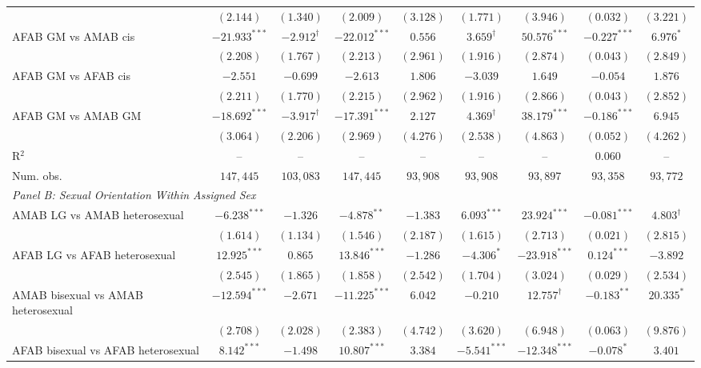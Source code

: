 \begin{table}[htpb!]
{\begin{tabular}{l c c c c c c c c}
 & $(2.144)$ & $(1.340)$ & $(2.009)$ & $(3.128)$ & $(1.771)$ & $(3.946)$ & $(0.032)$ & $(3.221)$ \\
AFAB GM vs AMAB cis & $-21.933^{***}$ & $-2.912^{\dagger}$ & $-22.012^{***}$ & $0.556$ & $3.659^{\dagger}$ & $50.576^{***}$ & $-0.227^{***}$ & $6.976^{*}$ \\
 & $(2.208)$ & $(1.767)$ & $(2.213)$ & $(2.961)$ & $(1.916)$ & $(2.874)$ & $(0.043)$ & $(2.849)$ \\
AFAB GM vs AFAB cis & $-2.551$ & $-0.699$ & $-2.613$ & $1.806$ & $-3.039$ & $1.649$ & $-0.054$ & $1.876$ \\
 & $(2.211)$ & $(1.770)$ & $(2.215)$ & $(2.962)$ & $(1.916)$ & $(2.866)$ & $(0.043)$ & $(2.852)$ \\
AFAB GM vs AMAB GM & $-18.692^{***}$ & $-3.917^{\dagger}$ & $-17.391^{***}$ & $2.127$ & $4.369^{\dagger}$ & $38.179^{***}$ & $-0.186^{***}$ & $6.945$ \\
 & $(3.064)$ & $(2.206)$ & $(2.969)$ & $(4.276)$ & $(2.538)$ & $(4.863)$ & $(0.052)$ & $(4.262)$ \\
\hline
R$^2$ & -- & -- & -- & -- & -- & -- & $0.060$ & -- \\
Num. obs. & $147,445$ & $103,083$ & $147,445$ & $93,908$ & $93,908$ & $93,897$ & $93,358$ & $93,772$ \\
\hline
\multicolumn{9}{l}{\textit{Panel B: Sexual Orientation Within Assigned Sex}} \\
AMAB LG vs AMAB heterosexual & $-6.238^{***}$ & $-1.326$ & $-4.878^{**}$ & $-1.383$ & $6.093^{***}$ & $23.924^{***}$ & $-0.081^{***}$ & $4.803^{\dagger}$ \\
 & $(1.614)$ & $(1.134)$ & $(1.546)$ & $(2.187)$ & $(1.615)$ & $(2.713)$ & $(0.021)$ & $(2.815)$ \\
AFAB LG vs AFAB heterosexual & $12.925^{***}$ & $0.865$ & $13.846^{***}$ & $-1.286$ & $-4.306^{*}$ & $-23.918^{***}$ & $0.124^{***}$ & $-3.892$ \\
 & $(2.545)$ & $(1.865)$ & $(1.858)$ & $(2.542)$ & $(1.704)$ & $(3.024)$ & $(0.029)$ & $(2.534)$ \\
AMAB bisexual vs AMAB heterosexual & $-12.594^{***}$ & $-2.671$ & $-11.225^{***}$ & $6.042$ & $-0.210$ & $12.757^{\dagger}$ & $-0.183^{**}$ & $20.335^{*}$ \\
 & $(2.708)$ & $(2.028)$ & $(2.383)$ & $(4.742)$ & $(3.620)$ & $(6.948)$ & $(0.063)$ & $(9.876)$ \\
AFAB bisexual vs AFAB heterosexual & $8.142^{***}$ & $-1.498$ & $10.807^{***}$ & $3.384$ & $-5.541^{***}$ & $-12.348^{***}$ & $-0.078^{*}$ & $3.401$ \\

\end{tabular}}
\end{table}
